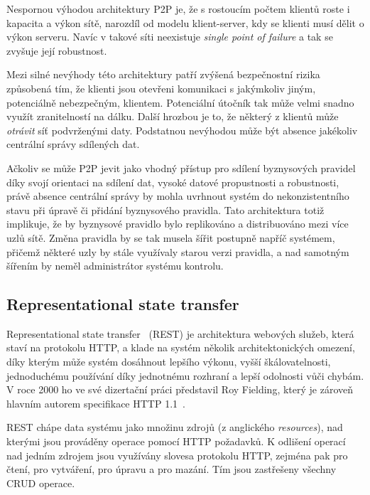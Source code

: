 Nespornou výhodou architektury \gls{P2P} je, že s rostoucím počtem klientů roste i
kapacita a výkon sítě, narozdíl od modelu klient-server, kdy se klienti musí dělit o výkon serveru.
Navíc v takové síti neexistuje \textit{single point of failure} a tak se zvyšuje její robustnost.

Mezi silné nevýhody této architektury patří zvýšená bezpečnostní rizika způsobená tím,
že klienti jsou otevřeni komunikaci s jakýmkoliv jiným, potenciálně nebezpečným, klientem.
Potenciální útočník tak může velmi snadno využít zranitelností na dálku.
Další hrozbou je to, že některý z klientů může \textit{otrávit} síť podvrženými daty.
Podstatnou nevýhodou může být absence jakékoliv centrální správy sdílených dat.

Ačkoliv se může \gls{P2P} jevit jako vhodný přístup pro sdílení byznysových pravidel
díky svojí orientaci na sdílení dat, vysoké datové propustnosti a robustnosti, právě absence
centrální správy by mohla uvrhnout systém do nekonzistentního stavu při úpravě či přidání
byznysového pravidla. Tato architektura totiž implikuje, že by byznysové pravidlo bylo
replikováno a distribuováno mezi více uzlů sítě. Změna pravidla by se tak musela šířit postupně
napříč systémem, přičemž některé uzly by stále využívaly starou verzi pravidla, a nad samotným
šířením by neměl administrátor systému kontrolu.

\subsection{Representational state transfer}\label{sec:rest}

Representational state transfer~\cite{fielding2000rest} (\gls{REST}) je architektura
webových služeb, která staví na protokolu \gls{HTTP}, a klade na systém
několik architektonických omezení, díky kterým může systém dosáhnout
lepšího výkonu, vyšší škálovatelnosti, jednoduchému používání díky jednotnému rozhraní
a lepší odolnosti vůči chybám. V roce 2000 ho ve své dizertační práci představil Roy Fielding,
který je zároveň hlavním autorem specifikace \gls{HTTP} 1.1~\cite{fielding1999hypertext}.

\gls{REST} chápe data systému jako množinu zdrojů (z anglického \textit{resources}),
nad kterými jsou prováděny operace pomocí \gls{HTTP} požadavků. K odlišení operací
nad jedním zdrojem jsou využívány slovesa protokolu \gls{HTTP}, zejména pak  pro čtení,
 pro vytváření,  pro úpravu a  pro mazání. Tím jsou zastřešeny
všechny \gls{CRUD} operace.

